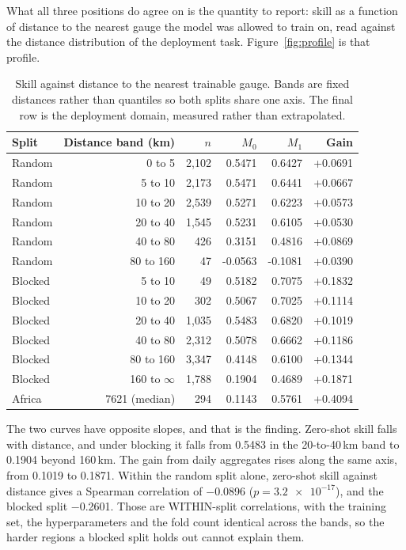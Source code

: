 \documentclass[11pt,a4paper]{article}
\begin{document}
What all three positions do agree on is the quantity to report: skill as a function of distance to the nearest gauge the model was allowed to train on, read against the distance distribution of the deployment task. Figure~\ref{fig:profile} is that profile.

\begin{table}[htbp]
  \centering
  \caption{Skill against distance to the nearest trainable gauge. Bands are fixed distances rather than quantiles so both splits share one axis. The final row is the deployment domain, measured rather than extrapolated.}
  \label{tab:profile}
  \begin{tabular}{lrrrrr}
    \toprule
    Split & Distance band (km) & $n$ & $M_0$ & $M_1$ & Gain \\
    \midrule
    Random & 0 to 5 & 2,102 & 0.5471 & 0.6427 & +0.0691 \\
    Random & 5 to 10 & 2,173 & 0.5471 & 0.6441 & +0.0667 \\
    Random & 10 to 20 & 2,539 & 0.5271 & 0.6223 & +0.0573 \\
    Random & 20 to 40 & 1,545 & 0.5231 & 0.6105 & +0.0530 \\
    Random & 40 to 80 & 426 & 0.3151 & 0.4816 & +0.0869 \\
    Random & 80 to 160 & 47 & -0.0563 & -0.1081 & +0.0390 \\
    Blocked & 5 to 10 & 49 & 0.5182 & 0.7075 & +0.1832 \\
    Blocked & 10 to 20 & 302 & 0.5067 & 0.7025 & +0.1114 \\
    Blocked & 20 to 40 & 1,035 & 0.5483 & 0.6820 & +0.1019 \\
    Blocked & 40 to 80 & 2,312 & 0.5078 & 0.6662 & +0.1186 \\
    Blocked & 80 to 160 & 3,347 & 0.4148 & 0.6100 & +0.1344 \\
    Blocked & 160 to $\infty$ & 1,788 & 0.1904 & 0.4689 & +0.1871 \\
    Africa & 7621 (median) & 294 & 0.1143 & 0.5761 & +0.4094 \\
    \bottomrule
  \end{tabular}
\end{table}

The two curves have opposite slopes, and that is the finding. Zero-shot skill falls with distance, and under blocking it falls from \num{0.5483} in the 20-to-40\,\si{\km} band to \num{0.1904} beyond \num{160}\,\si{\km}. The gain from daily aggregates rises along the same axis, from \num{+0.1019} to \num{+0.1871}. Within the random split alone, zero-shot skill against distance gives a Spearman correlation of \num{-0.0896} ($p = \num{3.2e-17}$), and the blocked split \num{-0.2601}. Those are WITHIN-split correlations, with the training set, the hyperparameters and the fold count identical across the bands, so the harder regions a blocked split holds out cannot explain them.
\end{document}
